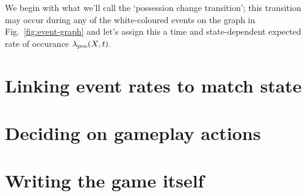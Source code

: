 We begin with what we'll call the `possession change transition'; this transition may occur during any of the white-coloured events on the graph in Fig.~\ref{fig:event-graph} and let's assign this a time and state-dependent expected rate of occurance $\lambda_{\rm pos}(X, t)$. 


\section{\sffamily Linking event rates to match state}

\section{\sffamily Deciding on gameplay actions}

\section{\sffamily Writing the game itself}